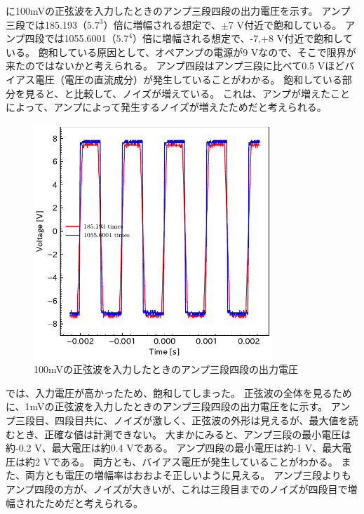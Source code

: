 \documentclass[report.tex]{subfiles}
\begin{document}
に100mVの正弦波を入力したときのアンプ三段四段の出力電圧を示す。
アンプ三段では185.193（\(5.7^3\)）倍に増幅される想定で、\(\pm\)7 V付近で飽和している。
アンプ四段では1055.6001（\(5.7^4\)）倍に増幅される想定で、-7,+8 V付近で飽和している。
飽和している原因として、オペアンプの電源が9 Vなので、そこで限界が来たのではないかと考えられる。
アンプ四段はアンプ三段に比べて0.5 Vほどバイアス電圧（電圧の直流成分）が発生していることがわかる。
飽和している部分を見ると、と比較して、ノイズが増えている。
これは、アンプが増えたことによって、アンプによって発生するノイズが増えたためだと考えられる。

\begin{figure}[H]
	\centering
	\includegraphics[width=9cm]{fig/level34_100m.pdf}
	\caption{100mVの正弦波を入力したときのアンプ三段四段の出力電圧}
	\label{fig:34_100m}
\end{figure}

では、入力電圧が高かったため、飽和してしまった。
正弦波の全体を見るために、1mVの正弦波を入力したときのアンプ三段四段の出力電圧をに示す。
アンプ三段目、四段目共に、ノイズが激しく、正弦波の外形は見えるが、最大値を読むとき、正確な値は計測できない。
大まかにみると、アンプ三段の最小電圧は約-0.2 V、最大電圧は約0.4 Vである。
アンプ四段の最小電圧は約-1 V、最大電圧は約2 Vである。
両方とも、バイアス電圧が発生していることがわかる。
また、両方とも電圧の増幅率はおおよそ正しいように見える。
アンプ三段よりもアンプ四段の方が、ノイズが大きいが、これは三段目までのノイズが四段目で増幅されたためだと考えられる。
\end{document}
